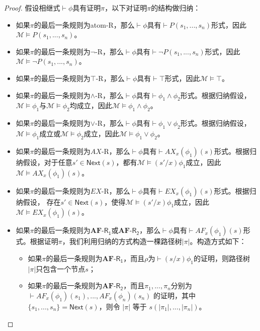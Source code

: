 \begin{proof}
	假设相继式$\vdash\phi$具有证明$\pi$，以下对证明$\pi$的结构做归纳：
	\begin{itemize}
		\item 如果$\pi$的最后一条规则为\textsf{atom-R}，那么$\vdash\phi$具有$\vdash P(s_1,...,s_n)$形式，因此$\mathcal{M}\models P(s_1,...,s_n)$。
		\item 如果$\pi$的最后一条规则为$\neg$-\textsf{R}，那么$\vdash\phi$具有$\vdash \neg P(s_1,...,s_n)$形式，因此$\mathcal{M}\models \neg P(s_1,...,s_n)$。
		\item 如果$\pi$的最后一条规则为$\top$-\textsf{R}，那么$\vdash\phi$具有$\vdash \top$形式，因此$\mathcal{M}\models \top$。
		\item 如果$\pi$的最后一条规则为$\wedge$-\textsf{R}，那么$\vdash\phi$具有$\vdash \phi_1\wedge\phi_2$形式。根据归纳假设，$\mathcal{M}\models \phi_1$与$\mathcal{M}\models \phi_2$均成立，因此$\mathcal{M}\models \phi_1\wedge\phi_2$。
		\item 如果$\pi$的最后一条规则为$\vee$-\textsf{R}，那么$\vdash\phi$具有$\vdash \phi_1\vee\phi_2$形式。根据归纳假设，$\mathcal{M}\models \phi_1$成立或$\mathcal{M}\models \phi_2$成立，因此$\mathcal{M}\models \phi_1\vee\phi_2$。
		
		\item 如果$\pi$的最后一条规则为$AX$-\textsf{R}，那么$\vdash\phi$具有$\vdash AX_x(\phi_1)(s)$形式。根据归纳假设，对于任意$s'\in\mathsf{Next}(s)$，都有$\mathcal{M}\models (s'/x)\phi_1$成立，因此$\mathcal{M}\models AX_x(\phi_1)(s)$。
		
		\item 如果$\pi$的最后一条规则为$EX$-\textsf{R}，那么$\vdash\phi$具有$\vdash EX_x(\phi_1)(s)$形式。根据归纳假设，  存在$s'\in\mathsf{Next}(s)$，使得$\mathcal{M}\models (s'/x)\phi_1$成立，因此$\mathcal{M}\models EX_x(\phi_1)(s)$。
		
		\item 如果$\pi$的最后一条规则为$\mathbf{AF}$-$\mathsf{R_1}$或$\mathbf{AF}$-$\mathsf{R_2}$，那么$\vdash\phi$具有$\vdash AF_x(\phi_1)(s)$形式。根据证明$\pi$，我们利用归纳的方式构造一棵路径树$|\pi|$。构造方式如下：
		\begin{itemize}		
			\item 如果$\pi$的最后一条规则为$\mathbf{AF}$-$\mathsf{R_1}$，而且$\rho$为$\vdash(s/x)\phi_1$的证明，则路径树$|\pi|$只包含一个节点$s$；
			
			\item 如果$\pi$的最后一条规则为$\mathbf{AF}$-$\mathsf{R_2}$，而且$\pi_1,...,\pi_n$分别为 \\$\vdash AF_x(\phi_1)(s_1),...,AF_x(\phi_n)(s_n)$ 的证明，其中$\{s_1,...,s_n\}=\mathsf{Next}(s)$，则令 $|\pi|$ 等于 $s(|\pi_1|,...,|\pi_n|)$。
		\end{itemize}
		

\end{itemize}
\end{proof}
